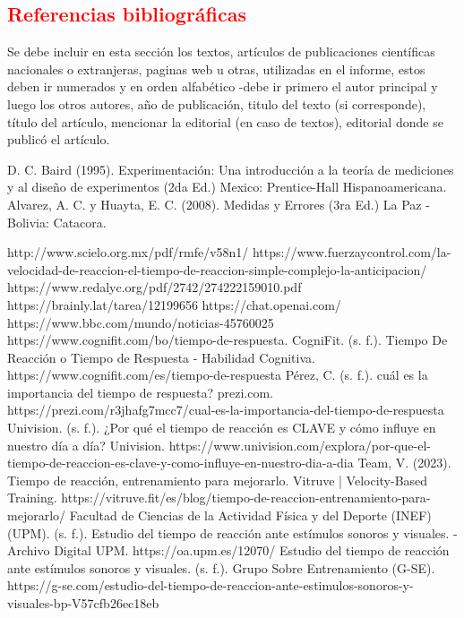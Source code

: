 \documentclass[11pt]{article}
\begin{document}
\begin{multicols}{2}
        \section{\textbf{\textcolor{red}{Referencias bibliográficas}}}
        \noindent Se debe incluir en esta sección los textos, artículos de publicaciones científicas nacionales o extranjeras, paginas web u otras, utilizadas en el informe, estos deben ir numerados y en orden alfabético -debe ir primero el autor principal y luego los otros autores, año de publicación, titulo del texto (si corresponde), título del artículo, mencionar la editorial (en caso de textos), editorial donde se publicó el artículo. \\
        \begin{thebibliography}{10}
             D. C. Baird (1995). Experimentación: Una introducción a la teoría de mediciones y al diseño de experimentos (2da Ed.) Mexico: Prentice-Hall Hispanoamericana.
             Alvarez, A. C. y Huayta, E. C. (2008). Medidas y Errores (3ra Ed.) La Paz - Bolivia: Catacora.

             http://www.scielo.org.mx/pdf/rmfe/v58n1/
             https://www.fuerzaycontrol.com/la-velocidad-de-reaccion-el-tiempo-de-reaccion-simple-complejo-la-anticipacion/
             https://www.redalyc.org/pdf/2742/274222159010.pdf
             https://brainly.lat/tarea/12199656
             https://chat.openai.com/
             https://www.bbc.com/mundo/noticias-45760025
             https://www.cognifit.com/bo/tiempo-de-respuesta.
             CogniFit. (s. f.). Tiempo De Reacción o Tiempo de Respuesta - Habilidad Cognitiva. https://www.cognifit.com/es/tiempo-de-respuesta
             Pérez, C. (s. f.). cuál es la importancia del tiempo de respuesta? prezi.com. https://prezi.com/r3jhafg7mcc7/cual-es-la-importancia-del-tiempo-de-respuesta
             Univision. (s. f.). ¿Por qué el tiempo de reacción es CLAVE y cómo influye en nuestro día a día? Univision. https://www.univision.com/explora/por-que-el-tiempo-de-reaccion-es-clave-y-como-influye-en-nuestro-dia-a-dia
             Team, V. (2023). Tiempo de reacción, entrenamiento para mejorarlo. Vitruve | Velocity-Based Training. https://vitruve.fit/es/blog/tiempo-de-reaccion-entrenamiento-para-mejorarlo/
             Facultad de Ciencias de la Actividad Física y del Deporte (INEF)(UPM). (s. f.). Estudio del tiempo de reacción ante estímulos sonoros y visuales. - Archivo Digital UPM. https://oa.upm.es/12070/
             Estudio del tiempo de reacción ante estímulos sonoros y visuales. (s. f.). Grupo Sobre Entrenamiento (G-SE). https://g-se.com/estudio-del-tiempo-de-reaccion-ante-estimulos-sonoros-y-visuales-bp-V57cfb26ec18eb


        \end{thebibliography}
    \end{multicols}
\end{document}
